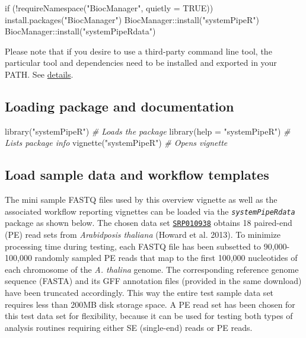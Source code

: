 \documentclass[14pt,]{article}
\newcommand{\hlstr}[1]{\textcolor[rgb]{0.251,0.627,0.251}{#1}}%
\newcommand{\hlcom}[1]{\textcolor[rgb]{0.502,0.502,0.502}{\textit{#1}}}%
\newcommand{\hlopt}[1]{\textcolor[rgb]{0,0,0}{#1}}%
\newcommand{\hlstd}[1]{\textcolor[rgb]{0.251,0.251,0.251}{#1}}%
\newcommand{\hlkwc}[1]{\textcolor[rgb]{0.251,0.251,0.251}{#1}}%
\newcommand{\hlkwd}[1]{\textcolor[rgb]{0.878,0.439,0.125}{#1}}%
\newenvironment{Shaded}{\begin{myshaded}}{\end{myshaded}}
\newcommand{\KeywordTok}[1]{\hlkwd{#1}}
\newcommand{\DataTypeTok}[1]{\hlkwc{#1}}
\newcommand{\StringTok}[1]{\hlstr{#1}}
\newcommand{\CommentTok}[1]{\hlcom{#1}}
\newcommand{\OtherTok}[1]{{#1}}
\newcommand{\ControlFlowTok}[1]{\hlkwd{#1}}
\newcommand{\OperatorTok}[1]{\hlopt{#1}}
\newcommand{\NormalTok}[1]{\hlstd{#1}}
\begin{document}
\begin{Shaded}
\begin{Highlighting}[]
\ControlFlowTok{if}\NormalTok{ (}\OperatorTok{!}\KeywordTok{requireNamespace}\NormalTok{(}\StringTok{"BiocManager"}\NormalTok{, }\DataTypeTok{quietly =} \OtherTok{TRUE}\NormalTok{)) }\KeywordTok{install.packages}\NormalTok{(}\StringTok{"BiocManager"}\NormalTok{)}
\NormalTok{BiocManager}\OperatorTok{::}\KeywordTok{install}\NormalTok{(}\StringTok{"systemPipeR"}\NormalTok{)}
\NormalTok{BiocManager}\OperatorTok{::}\KeywordTok{install}\NormalTok{(}\StringTok{"systemPipeRdata"}\NormalTok{)}
\end{Highlighting}
\end{Shaded}

Please note that if you desire to use a third-party command line tool, the particular tool and dependencies need to be installed and exported in your PATH. See \protect\hyperlink{tools}{details}.

\hypertarget{loading-package-and-documentation}{%
\subsection{Loading package and documentation}\label{loading-package-and-documentation}}

\begin{Shaded}
\begin{Highlighting}[]
\KeywordTok{library}\NormalTok{(}\StringTok{"systemPipeR"}\NormalTok{)  }\CommentTok{# Loads the package}
\KeywordTok{library}\NormalTok{(}\DataTypeTok{help =} \StringTok{"systemPipeR"}\NormalTok{)  }\CommentTok{# Lists package info}
\KeywordTok{vignette}\NormalTok{(}\StringTok{"systemPipeR"}\NormalTok{)  }\CommentTok{# Opens vignette}
\end{Highlighting}
\end{Shaded}

\hypertarget{load-sample-data-and-workflow-templates}{%
\subsection{Load sample data and workflow templates}\label{load-sample-data-and-workflow-templates}}

The mini sample FASTQ files used by this overview vignette as well as the
associated workflow reporting vignettes can be loaded via the \emph{\texttt{systemPipeRdata}}
package as shown below. The chosen data set \href{http://www.ncbi.nlm.nih.gov/sra/?term=SRP010938}{\texttt{SRP010938}}
obtains 18 paired-end (PE) read sets from \emph{Arabidposis thaliana} (Howard et al. 2013).
To minimize processing time during testing, each FASTQ file has been subsetted to
90,000-100,000 randomly sampled PE reads that map to the first 100,000 nucleotides
of each chromosome of the \emph{A. thalina} genome. The corresponding reference genome
sequence (FASTA) and its GFF annotation files (provided in the same download) have
been truncated accordingly. This way the entire test sample data set requires
less than 200MB disk storage space. A PE read set has been chosen for this test
data set for flexibility, because it can be used for testing both types of analysis
routines requiring either SE (single-end) reads or PE reads.
\end{document}
